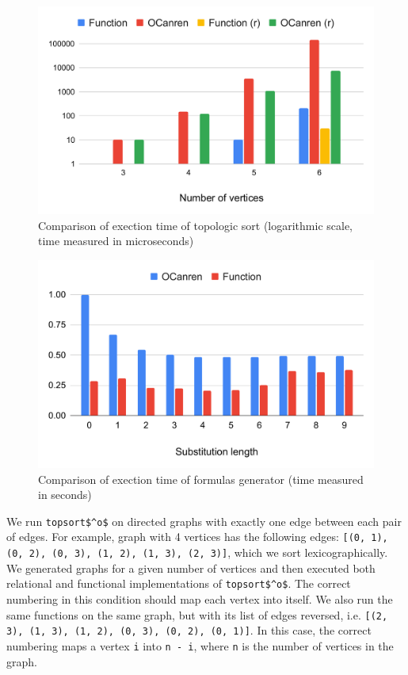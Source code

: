 \begin{figure}[!h]
  \vspace{-0.5cm}
  \includegraphics[width=\columnwidth]{fig/eval/topsort.pdf}
  \vspace{-0.7cm}
  \caption{Comparison of exection time of topologic sort (logarithmic scale, time measured in microseconds)}
  \label{graph:topsort}
\end{figure}


\begin{figure}[!h]
  \vspace{-0.5cm}
  \includegraphics[width=\columnwidth]{fig/eval/prop.pdf}
  \vspace{-0.7cm}
  \caption{Comparison of exection time of formulas generator (time measured in seconds)}
  \label{graph:prop}
\end{figure}




We run \lstinline{topsort$^o$} on directed graphs with exactly one edge between each pair of edges.
For example, graph with 4 vertices has the following edges: \lstinline[breaklines=true]{[(0, 1), (0, 2), (0, 3), (1, 2), (1, 3), (2, 3)]}, which we sort lexicographically.
We generated graphs for a given number of vertices and then executed both relational and functional implementations of \lstinline{topsort$^o$}.
The correct numbering in this condition should map each vertex into itself.
We also run the same functions on the same graph, but with its list of edges reversed, i.e. \lstinline[breaklines=true]{[(2, 3), (1, 3), (1, 2), (0, 3), (0, 2), (0, 1)]}.
In this case, the correct numbering maps a vertex \lstinline{i} into \lstinline{n - i}, where \lstinline{n} is the number of vertices in the graph.


